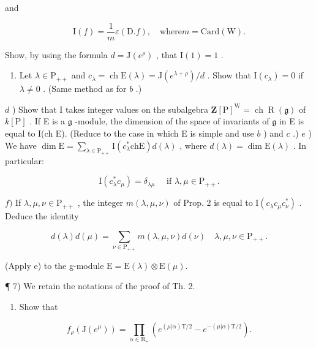 and

\[
\mathrm{I} (f) = \frac {1}{m} \varepsilon (\mathrm{D}. f), \quad \mathrm{where} m = \mathrm{Card} (\mathrm{W}).
\]

Show, by using the formula \(d = \mathrm{J}(e^{\rho})\) , that \(\mathrm{I}(1) = 1\) .

\begin{enumerate}
\def\labelenumi{\alph{enumi})}
\setcounter{enumi}{2}
\tightlist
\item
  Let \(\lambda \in \mathrm{P}_{++}\) and \(c_{\lambda} = \operatorname{ch} \mathrm{E}(\lambda) = \mathrm{J}(e^{\lambda + \rho}) / d\) . Show that \(\mathrm{I}(c_{\lambda}) = 0\) if \(\lambda \neq 0\) . (Same method as for \(b\) .)
\end{enumerate}

\(d\) ) Show that I takes integer values on the subalgebra \(\mathbf{Z}[\mathrm{P}]^{\mathrm{W}} = \operatorname {ch}\operatorname {R}(\mathfrak{g})\) of \(k[\mathrm{P}]\) . If E is a \(\mathfrak{g}\) -module, the dimension of the space of invariants of \(\mathfrak{g}\) in E is equal to I(ch E). (Reduce to the case in which E is simple and use \(b\) ) and \(c\) .) \(e\) ) We have \(\dim \mathrm{E} = \sum_{\lambda \in \mathrm{P}_{++}}\mathrm{I}(c_\lambda^*\mathrm{ch}\mathrm{E})d(\lambda)\) , where \(d(\lambda) = \dim \mathrm{E}(\lambda)\) . In particular:

\[
\mathrm{I} (c _ {\lambda} ^ {*} c _ {\mu}) = \delta_ {\lambda \mu} \quad \text { if } \lambda , \mu \in \mathrm{P} _ {+ +}.
\]

\(f)\) If \(\lambda, \mu, \nu \in \mathrm{P}_{++}\) , the integer \(m(\lambda, \mu, \nu)\) of Prop. 2 is equal to \(\mathrm{I}(c_{\lambda} c_{\mu} c_{\nu}^{*})\) . Deduce the identity

\[
d (\lambda) d (\mu) = \sum_ {\nu \in \mathrm{P} _ {+ +}} m (\lambda , \mu , \nu) d (\nu) \quad \lambda , \mu , \nu \in \mathrm{P} _ {+ +}.
\]

(Apply e) to the g-module \(\mathrm{E} = \mathrm{E}(\lambda) \otimes \mathrm{E}(\mu).\)

¶ 7) We retain the notations of the proof of Th. 2.

\begin{enumerate}
\def\labelenumi{\alph{enumi})}
\tightlist
\item
  Show that
\end{enumerate}

\[
f _ {\rho} (\mathrm{J} (e ^ {\mu})) = \prod_ {\alpha \in \mathrm{R} _ {+}} (e ^ {(\mu | \alpha) \mathrm{T} / 2} - e ^ {- (\mu | \alpha) \mathrm{T} / 2}).
\]

